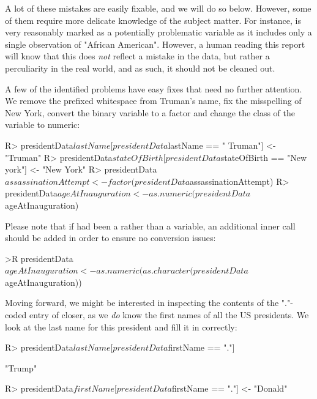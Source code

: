\documentclass[article,shortnames]{jss}
\begin{document}
A lot of these mistakes are easily fixable, and we will do so below. However, some of them require more delicate knowledge of the subject matter. For instance,  is very reasonably marked as a potentially problematic variable as it includes only a single observation of "African American". However, a human reading this report will know that this does \textit{not} reflect a mistake in the data, but rather a perculiarity in the real world, and as such, it should not be cleaned out. 

A few of the identified problems have easy fixes that need no further attention. We remove the prefixed whitespace from Truman's name, fix the misspelling of New York, convert the binary variable  to a factor and change the class of the  variable to numeric:
\begin{Schunk}
\begin{Sinput}
R> presidentData$lastName[presidentData$lastName == " Truman"] <- "Truman"
R> presidentData$stateOfBirth[presidentData$stateOfBirth == "New york"] <- "New York"
R> presidentData$assassinationAttempt <- factor(presidentData$assassinationAttempt)
R> presidentData$ageAtInauguration <- as.numeric(presidentData$ageAtInauguration)
\end{Sinput}
\end{Schunk}%
Please note that if  had been a  rather than a  variable, an additional inner call should be added in order to ensure no conversion issues:
\begin{Schunk}
\begin{Sinput}
>R presidentData$ageAtInauguration <- as.numeric(as.character(presidentData$ageAtInauguration))
\end{Sinput}
\end{Schunk}
Moving forward, we might be interested in inspecting the contents of the "."-coded entry of  closer, as we \textit{do} know the first names of all the US presidents. We look at the last name for this president and fill it in correctly:
\begin{Schunk}
\begin{Sinput}
R> presidentData$lastName[presidentData$firstName == "."]
\end{Sinput}
\begin{Soutput}
[1] "Trump"
\end{Soutput}
\begin{Sinput}
R> presidentData$firstName[presidentData$firstName == "."] <- "Donald"
\end{Sinput}
\end{Schunk}
\end{document}

